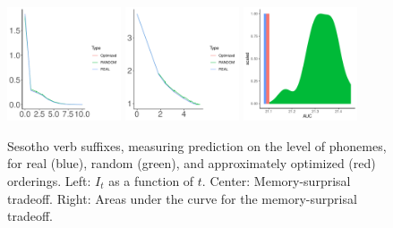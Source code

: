 \begin{figure}
	\begin{center}
\includegraphics[width=0.3\textwidth]{figures/Sesotho-suffixes-byPhonemes-it.pdf}
\includegraphics[width=0.3\textwidth]{figures/Sesotho-suffixes-byPhonemes-memsurp.pdf}
\includegraphics[width=0.3\textwidth]{figures/Sesotho-suffixes-byPhonemes-auc-hist.pdf}
\end{center}
	\caption{Sesotho verb suffixes, measuring prediction on the level of phonemes, for real (blue), random (green), and approximately optimized (red) orderings. Left: $I_t$ as a function of $t$. Center: Memory-surprisal tradeoff. Right: Areas under the curve for the memory-surprisal tradeoff.}\label{fig:jap-phon}
\end{figure}


